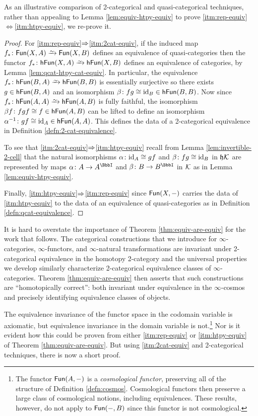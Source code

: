   As an illustrative comparison of 2-categorical and quasi-categorical techniques, rather than appealing to Lemma \ref{lem:equiv-htpy-equiv} to prove \ref{itm:rep-equiv}$\Leftrightarrow$\ref{itm:htpy-equiv}, we re-prove it.
  \begin{proof}
    For \ref{itm:rep-equiv}$\Rightarrow$\ref{itm:2cat-equiv}, if the induced map $f_* \colon \Fun(X,A) \we \Fun(X,B)$  defines an equivalence of quasi-categories then the functor $f_* \colon \hFun(X,A) \we \hFun(X,B)$ defines an equivalence of categories, by Lemma \ref{lem:qcat-htpy-cat-equiv}. In particular, the equivalence $f_* \colon \hFun(B,A) \we \hFun(B,B)$ is essentially surjective so there exists $g \in {\mathord{\mathsf{hFun}}}(B,A)$ and an isomorphism $\beta \colon fg \cong \textup{id}_B \in {\mathord{\mathsf{hFun}}}(B,B)$. Now since $f_* \colon \hFun(A,A) \we \hFun(A,B)$ is fully faithful, the isomorphism $\beta f \colon fgf \cong f \in {\mathord{\mathsf{hFun}}}(A,B)$ can be lifted to define an isomorphism $\alpha^{-1} \colon gf \cong \textup{id}_A \in {\mathord{\mathsf{hFun}}}(A,A)$. This defines the data of a 2-categorical equivalence in Definition \ref{defn:2-cat-equivalence}.

  To see that \ref{itm:2cat-equiv}$\Rightarrow$\ref{itm:htpy-equiv} recall from Lemma \ref{lem:invertible-2-cell} that the natural isomorphisms $\alpha \colon \textup{id}_A \cong gf$ and $\beta \colon fg \cong \textup{id}_B$ in $\mathfrak{h}{\mathord{\mathcal{K}}}$ are represented by maps $\alpha \colon A \to A^\iso$ and $\beta \colon B \to B^\iso$ in ${\mathord{\mathcal{K}}}$ as in Lemma \ref{lem:equiv-htpy-equiv}.

  Finally, \ref{itm:htpy-equiv}$\Rightarrow$\ref{itm:rep-equiv} since ${\mathord{\mathsf{Fun}}}(X,-)$ carries the data of \ref{itm:htpy-equiv} to the data of an equivalence of quasi-categories as in  Definition \ref{defn:qcat-equivalence}.
  \end{proof}

  It is hard to overstate the importance of Theorem \ref{thm:equiv-are-equiv} for the work that follows. The categorical constructions that we introduce for $\infty$-categories, $\infty$-func\-tors, and $\infty$-natural transformations are invariant under 2-cat\-e\-go\-ri\-cal equivalence in the homotopy 2-category and the universal properties we develop similarly characterize 2-categorical equivalence classes of $\infty$-cat\-e\-go\-ries. Theorem \ref{thm:equiv-are-equiv} then asserts that such constructions are ``homotopically correct'': both invariant under equivalence in the $\infty$-cosmos and precisely identifying equivalence classes of objects.


  The equivalence invariance of the functor space in the codomain variable is axiomatic, but equivalence invariance in the domain variable is not.\footnote{The functor ${\mathord{\mathsf{Fun}}}(A,-)$ is a \emph{cosmological functor}, preserving all of the structure of Definition \ref{defn:cosmos}. Cosmological functors then preserve a large class of cosmological notions, including equivalences. These results, however, %
  do not apply to ${\mathord{\mathsf{Fun}}}(-,B)$ since this functor is not cosmological.} Nor is it evident how this could be proven from either \ref{itm:rep-equiv} or \ref{itm:htpy-equiv} of Theorem \ref{thm:equiv-are-equiv}. But using \ref{itm:2cat-equiv} and 2-categorical techniques, there is now a short proof.

